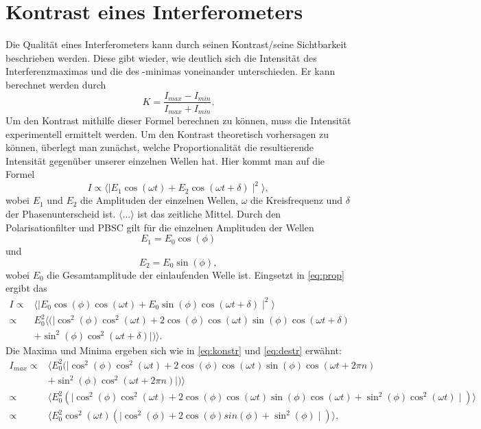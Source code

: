 \section{Kontrast eines Interferometers}
\label{sec:Kontrast}
Die Qualität eines Interferometers kann durch seinen Kontrast/seine Sichtbarkeit beschrieben werden. Diese gibt wieder, wie deutlich sich die Intensität des
Interferenzmaximas und die des -minimas voneinander unterschieden. Er kann berechnet werden durch
\begin{equation}
    \label{eqn:kontrast}
    K = \frac{I_{max} - I_{min}}{I_{max} + I_{min}}.
\end{equation}
Um den Kontrast mithilfe dieser Formel berechnen zu können, muss die Intensität experimentell ermittelt werden. Um den Kontrast theoretisch vorhersagen
zu können, überlegt man zunächst, welche Proportionalität die resultierende Intensität gegenüber unserer einzelnen Wellen hat. Hier kommt man auf die Formel
\begin{equation}
    \label{eq:prop}
    I \propto \langle \mid E_1 \cos{(\omega t)} + E_2 \cos{(\omega t + \delta)} \mid^2 \rangle,
\end{equation}
wobei $E_1$ und $E_2$ die Amplituden der einzelnen Wellen, $\omega$ die Kreisfrequenz und $\delta$ der Phasenunterscheid ist. $\langle ... \rangle$ ist das zeitliche Mittel.
Durch den Polarisationfilter und PBSC gilt
für die einzelnen Amplituden der Wellen
\begin{equation}
    E_1 = E_0 \cos{(\phi)}
\end{equation}
und
\begin{equation}
    E_2 = E_0 \sin{(\phi)},
\end{equation}
wobei $E_0$ die Gesamtamplitude der einlaufenden Welle ist. Eingsetzt in \autoref{eq:prop} ergibt das
\begin{align}
    I   \propto& \langle \mid E_0 \cos{(\phi)} \cos{(\omega t)} + E_0 \sin{(\phi)} \cos{(\omega t + \delta)} \mid^2 \rangle \\
        \propto& E_0^2 \langle (\mid \cos^2{(\phi)} \cos^2{(\omega t)} +  2 \cos{(\phi)} \cos{(\omega t)} \sin{(\phi)} \cos{(\omega t + \delta)} \\
                &+  \sin^2{(\phi)} \cos^2{(\omega t + \delta)} \mid ) \rangle.
\end{align}
Die Maxima und Minima ergeben sich wie in \autoref{eq:konstr} und \autoref{eq:destr} erwähnt:
\begin{align}
    I_{max} \propto&  \langle E_0^2 (\mid \cos^2{(\phi)} \cos^2{(\omega t)} +  2 \cos{(\phi)} \cos{(\omega t)} \sin{(\phi)} \cos{(\omega t + 2 \pi n)} \\
                    &+  \sin^2{(\phi)} \cos^2{(\omega t + 2 \pi n)} \mid ) \rangle  \\
            \propto&  \langle E_0^2 \left(\mid \cos^2{(\phi)} \cos^2{(\omega t)} +  2 \cos{(\phi)} \cos{(\omega t)} \sin{(\phi)} \cos{(\omega t)} +  \sin^2{(\phi)} \cos^2{(\omega t)} \mid \right) \rangle \\
            \propto&  \langle E_0^2 \cos^2{(\omega t)} \left(\mid \cos^2{(\phi)} +  2 \cos{(\phi)}sin{(\phi)} +  \sin^2{(\phi)} \mid \right) \rangle,
\end{align}

